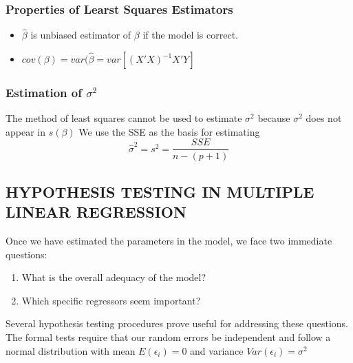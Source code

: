\documentclass[12pt]{article}
\numberwithin{equation}{section}
\begin{document}
\subsubsection*{Properties of Learst Squares Estimators}

\begin{itemize}
	\item $\hat{\beta}$ is unbiased estimator of $\beta$ if the model is correct.
	\item $cov(\beta)=var(\hat{\beta}=var[(X'X)^{-1}X'Y]$
\end{itemize}

\subsubsection*{Estimation of $\sigma^2$}
The method of least squares cannot be used to estimate $\sigma^2$ because $\sigma^2$ does not appear in $s(\beta)$
We use the SSE as the basis for estimating
$$
\hat{\sigma}^2=s^2=\frac{S S E}{n-(p+1)}
$$
\subsection{HYPOTHESIS TESTING IN MULTIPLE LINEAR REGRESSION}

Once we have estimated the parameters in the model, we face two
immediate questions:\\
\begin{enumerate}
	\item What is the overall adequacy of the model?
	\item Which specific regressors seem important? 
\end{enumerate}
Several hypothesis testing procedures prove useful for addressing
these questions. The formal tests require that our random errors be
independent and follow a normal distribution with mean $E(\epsilon_i)= 0$
and variance  $Var(\epsilon_i)=\sigma^2$ \\
\end{document}
